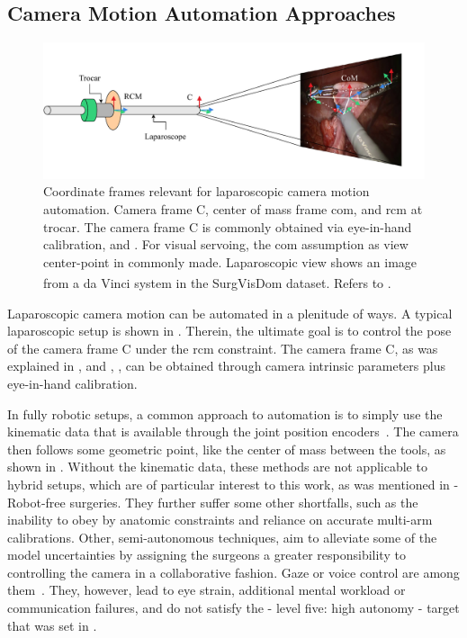 \subsection{Camera Motion Automation Approaches}
\label{in:sec:automation_approaches}
\begin{figure}[htb]
    \centering
    \includegraphics[width=\textwidth]{introduction/fig/rule_based_approaches.pdf}
    \caption{Coordinate frames relevant for laparoscopic camera motion automation. Camera frame C, center of mass frame \gls{com}, and \gls{rcm} at trocar. The camera frame C is commonly obtained via eye-in-hand calibration,  and . For visual servoing, the \gls{com} assumption as view center-point in commonly made. Laparoscopic view shows an image from a da Vinci\textsuperscript{\textregistered} system in the SurgVisDom\cite{zia2021surgical} dataset. Refers to .}
    \label{in:fig:com}
\end{figure}
Laparoscopic camera motion can be automated in a plenitude of ways. A typical laparoscopic setup is shown in . Therein, the ultimate goal is to control the pose of the camera frame C under the \gls{rcm} constraint. The camera frame C, as was explained in 
, and , , can be obtained through camera intrinsic parameters plus eye-in-hand calibration.

In fully robotic setups, a common approach to automation is to simply use the kinematic data that is available through the joint position encoders~\cite{da2020scan}. The camera then follows some geometric point, like the center of mass between the tools, as shown in . Without the kinematic data, these methods are not applicable to hybrid setups, which are of particular interest to this work, as was mentioned in  - Robot-free surgeries. They further suffer some other shortfalls, such as the inability to obey by anatomic constraints and reliance on accurate multi-arm calibrations. Other, semi-autonomous techniques, aim to alleviate some of the model uncertainties by assigning the surgeons a greater responsibility to controlling the camera in a collaborative fashion. Gaze or voice control are among them~\cite{taniguchi2010classification}. They, however, lead to eye strain, additional mental workload or communication failures, and do not satisfy the - level five: high autonomy - target that was set in .

